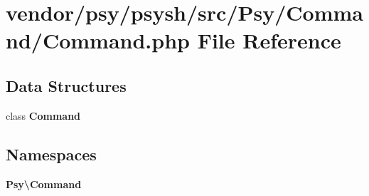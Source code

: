 \section{vendor/psy/psysh/src/\+Psy/\+Command/\+Command.php File Reference}
\label{vendor_2psy_2psysh_2src_2_psy_2_command_2_command_8php}
\subsection*{Data Structures}
\begin{DoxyCompactItemize}
\item 
class {\bf Command}
\end{DoxyCompactItemize}
\subsection*{Namespaces}
\begin{DoxyCompactItemize}
\item 
 {\bf Psy\textbackslash{}\+Command}
\end{DoxyCompactItemize}

